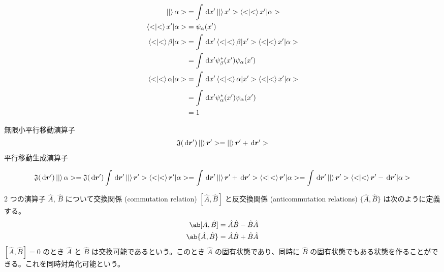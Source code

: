 \documentclass[uplatex,dvipdfmx,a4paper,11pt]{jlreq}
\newcommand{\rr}{\bm{r}}
\numberwithin{equation}{section}
\theoremstyle{definition}
\begin{document}
\begin{proposition}
  \begin{align}
    \ket|\alpha>           & = \int\dl{x'}\ket|x'>\braket<x'|\alpha>           \\
    \braket<x'|\alpha>     & = \psi_{\alpha}(x')                               \\
    \braket<\beta|\alpha>  & = \int\dl{x'}\braket<\beta|x'>\braket<x'|\alpha>  \\
                           & = \int\dl{x'}\psi_{\beta}^*(x')\psi_{\alpha}(x')  \\
    \braket<\alpha|\alpha> & = \int\dl{x'}\braket<\alpha|x'>\braket<x'|\alpha> \\
                           & = \int\dl{x'}\psi_{\alpha}^*(x')\psi_{\alpha}(x') \\
                           & = 1
  \end{align}
\end{proposition}
\begin{definition}[平行移動]
  無限小平行移動演算子
  \begin{align}
    \mathfrak{J}(\dl{\rr'})\ket|\rr'> = \ket|\rr' + \dl{\rr'}>
  \end{align}
  平行移動生成演算子
\end{definition}
\begin{align}
  \mathfrak{J}(\dl{\rr'})\ket|\alpha> = \mathfrak{J}(\dl{\rr'})\int\dl{\rr'}\ket|\rr'>\braket<\rr'|\alpha> = \int\dl{\rr'}\ket|\rr' + \dl{\rr'}>\braket<\rr'|\alpha> = \int\dl{\rr'}\ket|\rr'>\braket<\rr' - \dl{\rr'}|\alpha>
\end{align}

\begin{definition}
  2 つの演算子 $\hat{A}$, $\hat{B}$ について交換関係 (commutation relation) $[\hat{A}, \hat{B}]$ と反交換関係 (anticommutation relations) $\lbrace\hat{A}, \hat{B}\rbrace$ は次のように定義する。
  \begin{align}
    \ab[\hat{A}, \hat{B}]   & = \hat{A}\hat{B} - \hat{B}\hat{A} \\
    \ab\{\hat{A}, \hat{B}\} & = \hat{A}\hat{B} + \hat{B}\hat{A}
  \end{align}
  $[\hat{A}, \hat{B}] = 0$ のとき $\hat{A}$ と $\hat{B}$ は交換可能であるという。このとき $\hat{A}$ の固有状態であり、同時に $\hat{B}$ の固有状態でもある状態を作ることができる。これを同時対角化可能という。
\end{definition}
\end{document}
